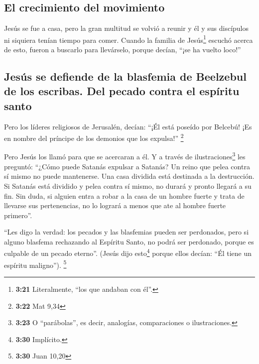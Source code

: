 \hypertarget{el-crecimiento-del-movimiento}{%
\subsection{El crecimiento del
movimiento}\label{el-crecimiento-del-movimiento}}

 Jesús se fue a casa, pero la gran multitud se volvió a
reunir y él y sus discípulos ni siquiera tenían tiempo para comer.
 Cuando la familia de Jesús\footnote{\textbf{3:21}
  Literalmente, ``los que andaban con él''.} escuchó acerca de esto,
fueron a buscarlo para llevárselo, porque decían, ``¡se ha vuelto
loco!''

\hypertarget{jesuxfas-se-defiende-de-la-blasfemia-de-beelzebul-de-los-escribas.-del-pecado-contra-el-espuxedritu-santo}{%
\subsection{Jesús se defiende de la blasfemia de Beelzebul de los
escribas. Del pecado contra el espíritu
santo}\label{jesuxfas-se-defiende-de-la-blasfemia-de-beelzebul-de-los-escribas.-del-pecado-contra-el-espuxedritu-santo}}

 Pero los líderes religiosos de Jerusalén, decían: ``¡Él
está poseído por Belcebú! ¡Es en nombre del príncipe de los demonios que
los expulsa!'' \footnote{\textbf{3:22} Mat 9,34}

 Pero Jesús los llamó para que se acercaran a él. Y a
través de ilustraciones\footnote{\textbf{3:23} O ``parábolas'', es
  decir, analogías, comparaciones o ilustraciones.} les preguntó:
``¿Cómo puede Satanás expulsar a Satanás?  Un reino que
pelea contra sí mismo no puede mantenerse.  Una casa
dividida está destinada a la destrucción.  Si Satanás
está dividido y pelea contra sí mismo, no durará y pronto llegará a su
fin.  Sin duda, si alguien entra a robar a la casa de un
hombre fuerte y trata de llevarse sus pertenencias, no lo logrará a
menos que ate al hombre fuerte primero''.

 ``Les digo la verdad: los pecados y las blasfemias
pueden ser perdonados,  pero si alguno blasfema
rechazando al Espíritu Santo, no podrá ser perdonado, porque es culpable
de un pecado eterno''.  (Jesús dijo esto\footnote{\textbf{3:30}
  Implícito.} porque ellos decían: ``Él tiene un espíritu maligno'').
\footnote{\textbf{3:30} Juan 10,20}

